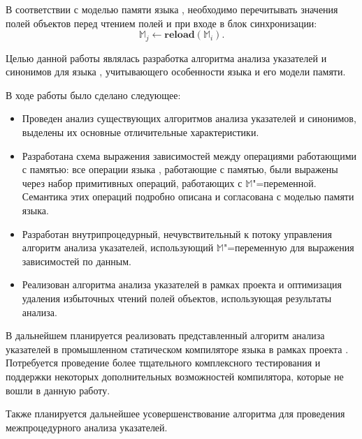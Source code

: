 \documentclass[14pt,titlepage,draft]{extarticle}
\newcommand{\java}{\eng{Java}\xspace}
\newcommand{\M}{\ensuremath{\mathbb{M}}}
\newcommand{\op}[1]{\mathbf{#1}}
\begin{document}
    В соответствии с моделью памяти языка \java, необходимо перечитывать
    значения полей объектов перед чтением  полей и при входе в
    блок синхронизации:
    \[ \M_j \gets \op{reload}(\M_i). \]



    Целью данной работы являлась разработка алгоритма анализа указателей и
    синонимов для языка \java, учитывающего особенности языка и его модели
    памяти.

    В ходе работы было сделано следующее:
    \begin{itemize}
      \item Проведен анализ существующих алгоритмов анализа указателей и
            синонимов, выделены их основные отличительные характеристики.
      \item Разработана схема выражения зависимостей между операциями
            работающими с памятью: все операции языка \java, работающие с
            памятью, были выражены через набор примитивных операций, работающих
            с \M"=переменной. Семантика этих операций подробно описана и
            согласована с моделью памяти языка.
      \item Разработан внутрипроцедурный, нечувствительный к потоку управления
            алгоритм анализа указателей, использующий \M"=переменную для
            выражения зависимостей по данным.
      \item Реализован алгоритма анализа указателей в рамках проекта
             и оптимизация удаления избыточных чтений полей
            объектов, использующая результаты анализа.
    \end{itemize}


    В дальнейшем планируется реализовать представленный алгоритм анализа
    указателей в промышленном статическом компиляторе языка \java в
    рамках проекта . Потребуется проведение более
    тщательного комплексного тестирования и поддержки некоторых дополнительных
    возможностей компилятора, которые не вошли в данную работу.

    Также планируется дальнейшее усовершенствование алгоритма для
    проведения межпроцедурного анализа указателей.


  \newpage
  
  
\end{document}
